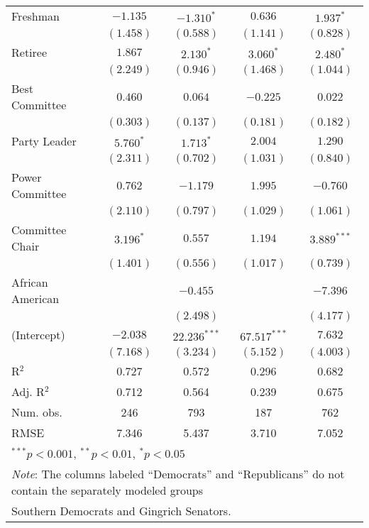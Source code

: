 \documentclass[12pt]{article}
\begin{document}
\begin{table}[!ht]
\begin{center}
\begin{tabular}{l c c c c }
			Freshman               & $-1.135$       & $-1.310^{*}$   & $0.636$        & $1.937^{*}$    \\
			& $(1.458)$      & $(0.588)$      & $(1.141)$      & $(0.828)$      \\
			Retiree                & $1.867$        & $2.130^{*}$    & $3.060^{*}$    & $2.480^{*}$    \\
			& $(2.249)$      & $(0.946)$      & $(1.468)$      & $(1.044)$      \\
			Best Committee        & $0.460$        & $0.064$        & $-0.225$       & $0.022$        \\
			& $(0.303)$      & $(0.137)$      & $(0.181)$      & $(0.182)$      \\
			Party Leader                 & $5.760^{*}$    & $1.713^{*}$    & $2.004$        & $1.290$        \\
			& $(2.311)$      & $(0.702)$      & $(1.031)$      & $(0.840)$      \\
			Power Committee       & $0.762$        & $-1.179$       & $1.995$        & $-0.760$       \\
			& $(2.110)$      & $(0.797)$      & $(1.029)$      & $(1.061)$      \\
			Committee Chair                  & $3.196^{*}$    & $0.557$        & $1.194$        & $3.889^{***}$  \\
			& $(1.401)$      & $(0.556)$      & $(1.017)$      & $(0.739)$      \\
			African American                   &                & $-0.455$       &                & $-7.396$       \\
			&                & $(2.498)$      &                & $(4.177)$      \\
			(Intercept)            & $-2.038$       & $22.236^{***}$ & $67.517^{***}$ & $7.632$        \\
			& $(7.168)$      & $(3.234)$      & $(5.152)$      & $(4.003)$      \\
			\hline
			R$^2$                  & 0.727          & 0.572          & 0.296          & 0.682          \\
			Adj. R$^2$             & 0.712          & 0.564          & 0.239          & 0.675          \\
			Num. obs.              & 246            & 793            & 187            & 762            \\
			RMSE                   & 7.346          & 5.437          & 3.710          & 7.052          \\
			\hline
			\multicolumn{5}{l}{\scriptsize{$^{***}p<0.001$, $^{**}p<0.01$, $^*p<0.05$}} \\
			\multicolumn{5}{l}{\footnotesize{\textit{Note}: The columns labeled ``Democrats'' and ``Republicans'' do not contain the separately modeled groups}} \\
			\multicolumn{5}{l}{\footnotesize{Southern Democrats and Gingrich Senators.}}
		\end{tabular}
	\end{center}
\end{table}
\end{document}
